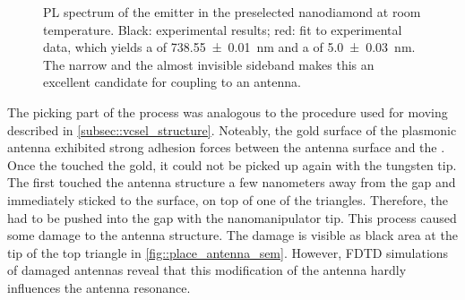 				\begin{figure}[htp]
						\centering
						\label{fig::spectrum_nd_multiple}
					\caption[Spectrum of a \nd containing at least one \siv]{PL spectrum of the emitter in the preselected nanodiamond at room temperature. Black: experimental results; red: fit to experimental data, which yields a \ZPL \cwl of \SI[separate-uncertainty = true]{738.55\pm0.01}{nm} and a \lw of \SI[separate-uncertainty = true]{5.0\pm0.03}{nm}. The narrow \cwl and the almost invisible sideband makes this \nd an excellent candidate for coupling to an antenna.}
				\end{figure}

			The picking part of the \pp process was analogous to the procedure used for moving \VCSELs described in \autoref{subsec::vcsel_structure}.
			Noteably, the gold surface of the plasmonic antenna exhibited strong adhesion forces between the antenna surface and the \nd.
			Once the \nd touched the gold, it could not be picked up again with the tungsten tip.
			The \nd first touched the antenna structure a few nanometers away from the gap and immediately sticked to the surface, on top of one of the triangles.
			Therefore, the \nd had to be pushed into the gap with the nanomanipulator tip.
			This process caused some damage to the antenna structure.
			The damage is visible as black area at the tip of the top triangle in \autoref{fig::place_antenna_sem}.
			However, FDTD simulations of damaged antennas reveal that this modification of the antenna hardly influences the antenna resonance.

